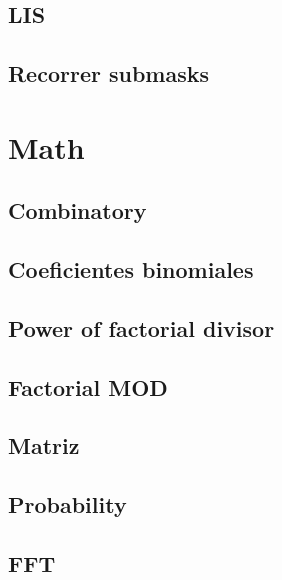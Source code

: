 \subsection{LIS}
\raggedbottom
\hrulefill
\subsection{Recorrer submasks}
\raggedbottom
\hrulefill

\section{Math}
\subsection{Combinatory}
\begingroup\setlength{\parindent}{0pt}\setlength{\parskip}{2pt}\par\endgroup
\hrulefill
\subsection{Coeficientes binomiales}
\raggedbottom
\hrulefill
\subsection{Power of factorial divisor}
\raggedbottom
\hrulefill
\subsection{Factorial MOD}
\raggedbottom
\hrulefill
\subsection{Matriz}
\raggedbottom
\hrulefill
\subsection{Probability}
\begingroup\setlength{\parindent}{0pt}\setlength{\parskip}{2pt}\par\endgroup
\hrulefill
\subsection{FFT}
\raggedbottom
\hrulefill
